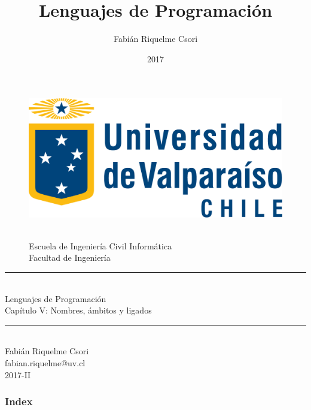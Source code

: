 \documentclass{beamer} %
\title{Lenguajes de Programación}                     %
\author{Fabián Riquelme Csori}                        %
\date{2017}                                           %
\institute{Universidad de Valparaíso}                 %
\newcommand{\HRule}{\rule{\linewidth}{0.2mm}\\[1ex]}
\begin{document}
%

\begin{frame}[plain]
  \begin{figure}[h]
    \begin{minipage}{0.3\textwidth}
    \includegraphics[width=.9\textwidth]{./image/logo-UV.png}
    \end{minipage}
    \begin{minipage}{0.65\textwidth}
     $~$\\[3.6ex]
     \footnotesize{Escuela de Ingeniería Civil Informática}\\
     \footnotesize{Facultad de Ingeniería}
    \end{minipage}
  \end{figure}
  \begin{center}
    \vspace{1ex}
    \HRule
    \Large{Lenguajes de Programación}\\{\small Capítulo V: Nombres, ámbitos y ligados}\\[-1ex]
    \HRule\vspace{1ex}
    \large{Fabián Riquelme Csori}\\[.5ex]\footnotesize{fabian.riquelme@uv.cl}\\[6ex] {\tiny 2017-II}\\[6ex]
  \end{center}
\end{frame}

\begin{frame}
 \frametitle{Index}
 \scriptsize 			%
 \tableofcontents		%
\end{frame}
\end{document}
